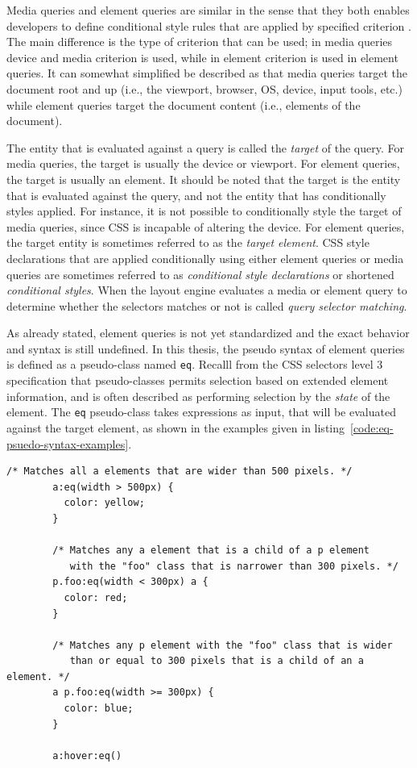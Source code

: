 \documentclass[a4paper,11pt]{kth-mag}
\newcommand{\code}[1]{\texttt{#1}}
\begin{document}
      Media queries and element queries are similar in the sense that they both enables developers to define conditional style rules that are applied by specified criterion \cite{w3c_css_mq}.
      The main difference is the type of criterion that can be used; in media queries device and media criterion is used, while in element criterion is used in element queries.
      It can somewhat simplified be described as that media queries target the document root and up (i.e., the viewport, browser, OS, device, input tools, etc.) while element queries target the document content (i.e., elements of the document).

      The entity that is evaluated against a query is called the \emph{target} of the query.
      For media queries, the target is usually the device or viewport.
      For element queries, the target is usually an element.
      It should be noted that the target is the entity that is evaluated against the query, and not the entity that has conditionally styles applied.
      For instance, it is not possible to conditionally style the target of media queries, since \gls{CSS} is incapable of altering the device.
      For element queries, the target entity is sometimes referred to as the \emph{target element}.
      \gls{CSS} style declarations that are applied conditionally using either element queries or media queries are sometimes referred to as \emph{conditional style declarations} or shortened \emph{conditional styles}.
      When the layout engine evaluates a media or element query to determine whether the selectors matches or not is called \emph{query selector matching}.

      As already stated, element queries is not yet standardized and the exact behavior and syntax is still undefined.
      In this thesis, the pseudo syntax of element queries is defined as a pseudo-class named \code{eq}.
      Recalll from the \gls{CSS} selectors level 3 specification \cite{w3c_css_selectors} that pseudo-classes permits selection based on extended element information, and is often described as performing selection by the \emph{state} of the element.
      The \code{eq} pseudo-class takes expressions as input, that will be evaluated against the target element, as shown in the examples given in listing~\ref{code:eq-psuedo-syntax-examples}.
      \begin{lstlisting}[gobble=8,caption={Examples of the psuedo element queries syntax.}, captionpos=b, label={code:eq-psuedo-syntax-examples}]
        /* Matches all a elements that are wider than 500 pixels. */
        a:eq(width > 500px) {
          color: yellow;
        }

        /* Matches any a element that is a child of a p element 
           with the "foo" class that is narrower than 300 pixels. */
        p.foo:eq(width < 300px) a {
          color: red;
        }

        /* Matches any p element with the "foo" class that is wider 
           than or equal to 300 pixels that is a child of an a element. */
        a p.foo:eq(width >= 300px) {
          color: blue;
        }

        a:hover:eq()
      \end{lstlisting}
\end{document}
